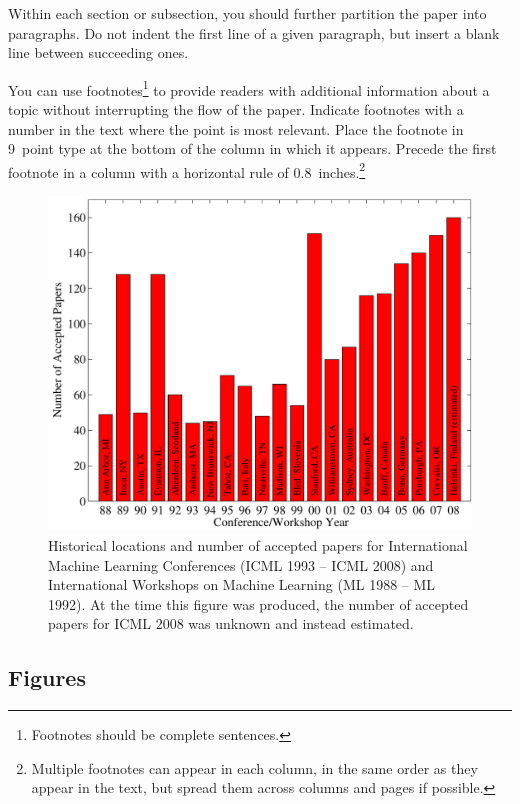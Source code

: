 \documentclass{article}
\theoremstyle{plain}
\theoremstyle{definition}
\theoremstyle{remark}
\begin{document}
Within each section or subsection, you should further partition the
paper into paragraphs. Do not indent the first line of a given
paragraph, but insert a blank line between succeeding ones.

You can use footnotes\footnote{Footnotes
should be complete sentences.} to provide readers with additional
information about a topic without interrupting the flow of the paper.
Indicate footnotes with a number in the text where the point is most
relevant. Place the footnote in 9~point type at the bottom of the
column in which it appears. Precede the first footnote in a column
with a horizontal rule of 0.8~inches.\footnote{Multiple footnotes can
appear in each column, in the same order as they appear in the text,
but spread them across columns and pages if possible.}

\begin{figure}[ht]
\vskip 0.2in
\begin{center}
\centerline{\includegraphics[width=\columnwidth]{icml_numpapers}}
\caption{Historical locations and number of accepted papers for International
Machine Learning Conferences (ICML 1993 -- ICML 2008) and International
Workshops on Machine Learning (ML 1988 -- ML 1992). At the time this figure was
produced, the number of accepted papers for ICML 2008 was unknown and instead
estimated.}
\label{icml-historical}
\end{center}
\vskip -0.2in
\end{figure}

\subsection{Figures}
\end{document}
